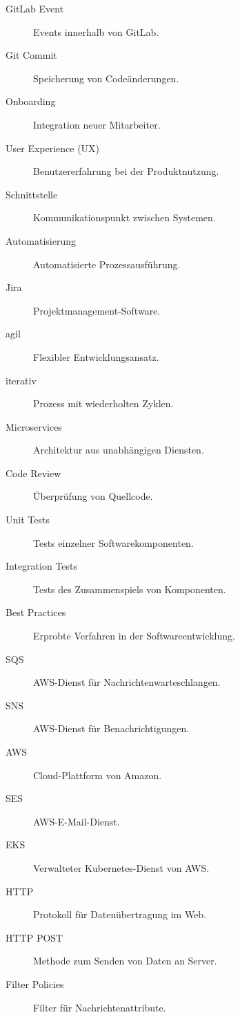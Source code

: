 \begin{description}
    \item[\hypertarget{GitLabEvent}{GitLab Event}] Events innerhalb von GitLab.
    \item[\hypertarget{GitCommit}{Git Commit}] Speicherung von Codeänderungen.
    \item[\hypertarget{Onboarding}{Onboarding}] Integration neuer Mitarbeiter.
    \item[\hypertarget{UserExperience}{User Experience (UX)}] Benutzererfahrung bei der Produktnutzung.
    \item[\hypertarget{Schnittstelle}{Schnittstelle}] Kommunikationspunkt zwischen Systemen.
    \item[\hypertarget{Automatisierung}{Automatisierung}] Automatisierte Prozessausführung.
    \item[\hypertarget{Jira}{Jira}] Projektmanagement-Software.
    \item[\hypertarget{agil}{agil}] Flexibler Entwicklungsansatz.
    \item[\hypertarget{iterativ}{iterativ}] Prozess mit wiederholten Zyklen.
    \item[\hypertarget{Microservices}{Microservices}] Architektur aus unabhängigen Diensten.
    \item[\hypertarget{CodeReview}{Code Review}] Überprüfung von Quellcode.
    \item[\hypertarget{UnitTests}{Unit Tests}] Tests einzelner Softwarekomponenten.
    \item[\hypertarget{IntegrationTests}{Integration Tests}] Tests des Zusammenspiels von Komponenten.
    \item[\hypertarget{BestPractices}{Best Practices}] Erprobte Verfahren in der Softwareentwicklung.
    \item[\hypertarget{SQS}{SQS}] AWS-Dienst für Nachrichtenwarteschlangen.
    \item[\hypertarget{SNS}{SNS}] AWS-Dienst für Benachrichtigungen.
    \item[\hypertarget{AWS}{AWS}] Cloud-Plattform von Amazon.
    \item[\hypertarget{SES}{SES}] AWS-E-Mail-Dienst.
    \item[\hypertarget{EKS}{EKS}] Verwalteter Kubernetes-Dienst von AWS.
    \item[\hypertarget{HTTP}{HTTP}] Protokoll für Datenübertragung im Web.
    \item[\hypertarget{HTTPPOST}{HTTP POST}] Methode zum Senden von Daten an Server.
    \item[\hypertarget{FilterPolicies}{Filter Policies}] Filter für Nachrichtenattribute.

\end{description}
